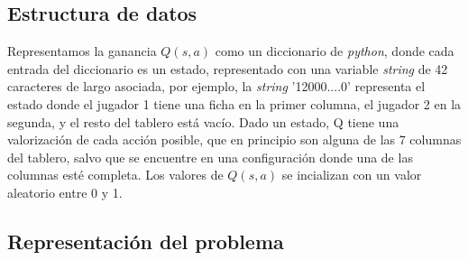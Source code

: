 \documentclass[11pt, spanish]{article}
\begin{document}
\subsection{Estructura de datos}

\par Representamos la ganancia $Q(s,a)$ como un diccionario de \emph{python}, donde cada entrada del diccionario es un estado, representado con una variable \emph{string} de 42 caracteres de largo asociada, por ejemplo, la \emph{string} '12000....0' representa el estado donde el jugador 1 tiene una ficha en la primer columna, el jugador 2 en la segunda, y el resto del tablero está vacío. Dado un estado, Q tiene una valorización de cada acción posible, que en principio son alguna de las 7 columnas del tablero, salvo que se encuentre en una configuración donde una de las columnas esté completa. Los valores de $Q(s,a)$ se incializan con un valor aleatorio entre 0 y 1.

\subsection{Representación del problema}
\end{document}
